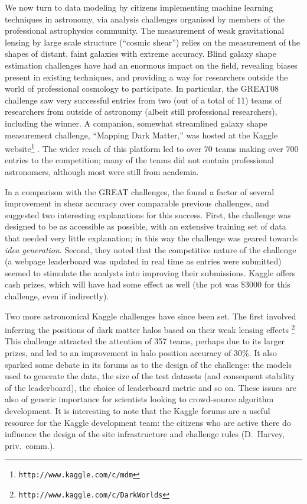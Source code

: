 \documentclass{ar2e}
\def\CaseStudy#1{\noindent{\it\bf #1 \,\,\,\,}}
\def\url#1{\texttt{#1}}
\begin{document}
\CaseStudy{Online Data Challenges}
We now turn to data modeling by citizens implementing machine learning
techniques in astronomy, via analysis challenges organised by members of the
professional astrophysics community. The measurement of weak gravitational
lensing by large scale structure (``cosmic shear'') relies on the measurement of
the shapes of distant, faint galaxies with extreme accuracy. 
Blind galaxy shape
estimation challenges have had an enormous impact on the field, revealing biases
present in existing techniques, and providing a way for researchers outside the
world of professional cosmology to participate. In particular, the GREAT08
challenge \citep{BridleEtal2010} saw very successful entries from two (out of a total of 11) teams of
researchers from outside of astronomy (albeit still professional researchers),
including the winner. A companion, somewhat streamlined galaxy shape measurement
challenge, ``Mapping Dark Matter,'' was hosted at the Kaggle
website\footnote{\url{http://www.kaggle.com/c/mdm}} \citep{KitchingEtal2012}.
The wider reach of this platform led to over 70 teams making over 700 entries to
the competition; many of the teams did not contain professional astronomers,
although most were still from academia.

In a comparison with the GREAT challenges, the \citeauthor{KitchingEtal2012}
found a factor of several improvement in shear accuracy over comparable previous
challenges, and suggested two interesting explanations for this success. First,
the challenge was designed to be as accessible as possible, with an extensive
training set of data that needed very little explanation; in this way the
challenge was geared towards {\it idea generation}. Second, they noted that the
competitive  nature of the challenge (a webpage leaderboard was updated in real
time as entries were submitted) seemed to stimulate the analysts into improving
their submissions. Kaggle offers cash prizes, which will have had some effect as
well (the pot was \$3000 for this challenge, even if indirectly).

Two more astronomical Kaggle challenges have since been set. The first involved
inferring the positions of dark matter halos based on their weak lensing effects
\citep{Harvey++2014}\footnote{\url{http://www.kaggle.com/c/DarkWorlds}}  This
challenge attracted the attention of 357 teams, perhaps due to its larger
prizes, and led to an improvement in halo position accuracy of 30\%.  It also
sparked some debate in its forums as to the design of the challenge: the models
used to generate the data, the size of the test datasets (and consequent
stability of the leaderboard),  the choice of leaderboard metric and so on.
These issues are also of generic importance for scientists looking to
crowd-source algorithm development.   It is interesting to note that the Kaggle
forums are a useful resource for the Kaggle development team: the citizens who
are active there do influence the design of the site infrastructure and
challenge rules (D.~Harvey, priv.~comm.). 
\end{document}
